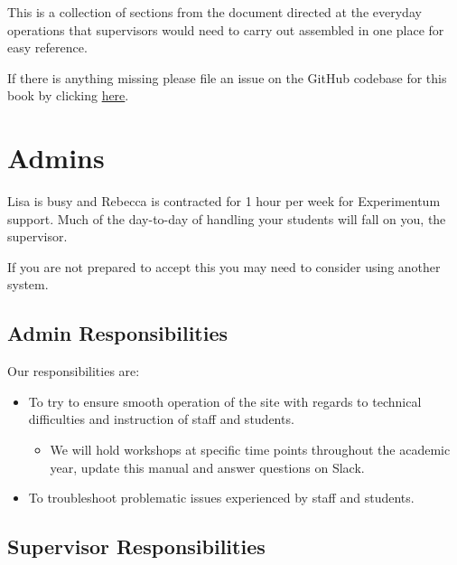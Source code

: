 \documentclass[]{book}
\providecommand{\tightlist}{%
  \setlength{\itemsep}{0pt}\setlength{\parskip}{0pt}}
\begin{document}
This is a collection of sections from the document directed at the everyday operations that supervisors would need to carry out assembled in one place for easy reference.

If there is anything missing please file an issue on the GitHub codebase for this book by clicking \href{https://github.com/RebeccaJLai/exp_manual/issues}{here}.

\hypertarget{roles}{%
\section*{Admins}\label{roles}}

Lisa is busy and Rebecca is contracted for 1 hour per week for Experimentum support. Much of the day-to-day of handling your students will fall on you, the supervisor.

If you are not prepared to accept this you may need to consider using another system.

\hypertarget{admin-responsibilities}{%
\subsection*{Admin Responsibilities}\label{admin-responsibilities}}

Our responsibilities are:

\begin{itemize}
\tightlist
\item
  To try to ensure smooth operation of the site with regards to technical difficulties and instruction of staff and students.

  \begin{itemize}
  \tightlist
  \item
    We will hold workshops at specific time points throughout the academic year, update this manual and answer questions on Slack.
  \end{itemize}
\item
  To troubleshoot problematic issues experienced by staff and students.
\end{itemize}

\hypertarget{supervisor-responsibilities}{%
\subsection*{Supervisor Responsibilities}\label{supervisor-responsibilities}}
\end{document}
